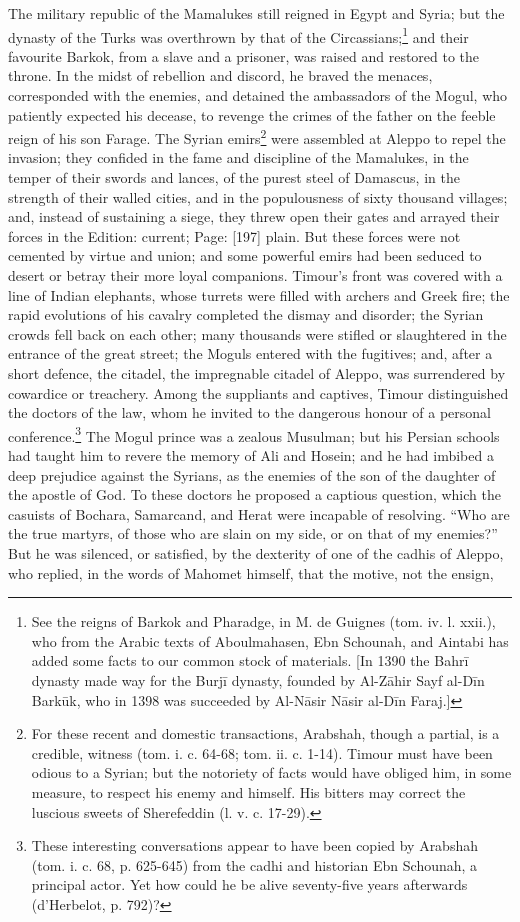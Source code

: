 The military republic of the Mamalukes still reigned in Egypt and Syria; but the dynasty of the Turks was overthrown by that of the Circassians;\footnote{See the reigns of Barkok and Pharadge, in M. de Guignes (tom. iv. l. xxii.), who from the Arabic texts of Aboulmahasen, Ebn Schounah, and Aintabi has added some facts to our common stock of materials. [In 1390 the Bahrī dynasty made way for the Burjī dynasty, founded by Al-Zāhir Sayf al-Dīn Barkūk, who in 1398 was succeeded by Al-Nāsir Nāsir al-Dīn Faraj.]} and their favourite Barkok, from a slave and a prisoner, was raised and restored to the throne. In the midst of rebellion and discord, he braved the menaces, corresponded with the enemies, and detained the ambassadors of the Mogul, who patiently expected his decease, to revenge the crimes of the father on the feeble reign of his son Farage. The Syrian emirs\footnote{For these recent and domestic transactions, Arabshah, though a partial, is a credible, witness (tom. i. c. 64-68; tom. ii. c. 1-14). Timour must have been odious to a Syrian; but the notoriety of facts would have obliged him, in some measure, to respect his enemy and himself. His bitters may correct the luscious sweets of Sherefeddin (l. v. c. 17-29).} were assembled at Aleppo to repel the invasion; they confided in the fame and discipline of the Mamalukes, in the temper of their swords and lances, of the purest steel of Damascus, in the strength of their walled cities, and in the populousness of sixty thousand villages; and, instead of sustaining a siege, they threw open their gates and arrayed their forces in the Edition: current; Page: [197] plain. But these forces were not cemented by virtue and union; and some powerful emirs had been seduced to desert or betray their more loyal companions. Timour\texthebrew{}’s front was covered with a line of Indian elephants, whose turrets were filled with archers and Greek fire; the rapid evolutions of his cavalry completed the dismay and disorder; the Syrian crowds fell back on each other; many thousands were stifled or slaughtered in the entrance of the great street; the Moguls entered with the fugitives; and, after a short defence, the citadel, the impregnable citadel of Aleppo, was surrendered by cowardice or treachery. Among the suppliants and captives, Timour distinguished the doctors of the law, whom he invited to the dangerous honour of a personal conference.\footnote{These interesting conversations appear to have been copied by Arabshah (tom. i. c. 68, p. 625-645) from the cadhi and historian Ebn Schounah, a principal actor. Yet how could he be alive seventy-five years afterwards (d\texthebrew{}’Herbelot, p. 792)?} The Mogul prince was a zealous Musulman; but his Persian schools had taught him to revere the memory of Ali and Hosein; and he had imbibed a deep prejudice against the Syrians, as the enemies of the son of the daughter of the apostle of God. To these doctors he proposed a captious question, which the casuists of Bochara, Samarcand, and Herat were incapable of resolving. \texthebrew{“}Who are the true martyrs, of those who are slain on my side, or on that of my enemies?\texthebrew{}” But he was silenced, or satisfied, by the dexterity of one of the cadhis of Aleppo, who replied, in the words of Mahomet himself, that the motive, not the ensign, 